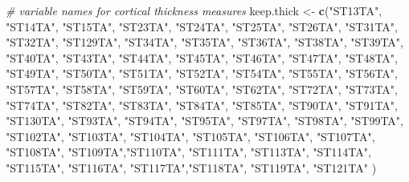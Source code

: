 \documentclass[
]{article}
\newenvironment{Shaded}{\begin{snugshade}}{\end{snugshade}}
\newcommand{\CommentTok}[1]{\textcolor[rgb]{0.56,0.35,0.01}{\textit{#1}}}
\newcommand{\KeywordTok}[1]{\textcolor[rgb]{0.13,0.29,0.53}{\textbf{#1}}}
\newcommand{\NormalTok}[1]{#1}
\newcommand{\StringTok}[1]{\textcolor[rgb]{0.31,0.60,0.02}{#1}}
\begin{document}
\begin{Shaded}
\begin{Highlighting}[]
\CommentTok{# variable names for cortical thickness measures}
\NormalTok{keep.thick <-}\StringTok{ }\KeywordTok{c}\NormalTok{(}\StringTok{"ST13TA"}\NormalTok{, }\StringTok{"ST14TA"}\NormalTok{, }\StringTok{"ST15TA"}\NormalTok{, }\StringTok{"ST23TA"}\NormalTok{, }\StringTok{"ST24TA"}\NormalTok{, }\StringTok{"ST25TA"}\NormalTok{,}
                \StringTok{"ST26TA"}\NormalTok{, }\StringTok{"ST31TA"}\NormalTok{, }\StringTok{"ST32TA"}\NormalTok{, }\StringTok{"ST129TA"}\NormalTok{, }\StringTok{"ST34TA"}\NormalTok{, }\StringTok{"ST35TA"}\NormalTok{,}
                \StringTok{"ST36TA"}\NormalTok{, }\StringTok{"ST38TA"}\NormalTok{, }\StringTok{"ST39TA"}\NormalTok{, }\StringTok{"ST40TA"}\NormalTok{, }\StringTok{"ST43TA"}\NormalTok{, }\StringTok{"ST44TA"}\NormalTok{,}
                \StringTok{"ST45TA"}\NormalTok{, }\StringTok{"ST46TA"}\NormalTok{, }\StringTok{"ST47TA"}\NormalTok{, }\StringTok{"ST48TA"}\NormalTok{, }\StringTok{"ST49TA"}\NormalTok{, }\StringTok{"ST50TA"}\NormalTok{,}
                \StringTok{"ST51TA"}\NormalTok{, }\StringTok{"ST52TA"}\NormalTok{, }\StringTok{"ST54TA"}\NormalTok{, }\StringTok{"ST55TA"}\NormalTok{, }\StringTok{"ST56TA"}\NormalTok{, }\StringTok{"ST57TA"}\NormalTok{,}
                \StringTok{"ST58TA"}\NormalTok{, }\StringTok{"ST59TA"}\NormalTok{, }\StringTok{"ST60TA"}\NormalTok{, }\StringTok{"ST62TA"}\NormalTok{, }\StringTok{"ST72TA"}\NormalTok{, }\StringTok{"ST73TA"}\NormalTok{,}
                \StringTok{"ST74TA"}\NormalTok{, }\StringTok{"ST82TA"}\NormalTok{, }\StringTok{"ST83TA"}\NormalTok{, }\StringTok{"ST84TA"}\NormalTok{, }\StringTok{"ST85TA"}\NormalTok{, }\StringTok{"ST90TA"}\NormalTok{,}
                \StringTok{"ST91TA"}\NormalTok{, }\StringTok{"ST130TA"}\NormalTok{, }\StringTok{"ST93TA"}\NormalTok{, }\StringTok{"ST94TA"}\NormalTok{, }\StringTok{"ST95TA"}\NormalTok{, }\StringTok{"ST97TA"}\NormalTok{,}
                \StringTok{"ST98TA"}\NormalTok{, }\StringTok{"ST99TA"}\NormalTok{, }\StringTok{"ST102TA"}\NormalTok{, }\StringTok{"ST103TA"}\NormalTok{, }\StringTok{"ST104TA"}\NormalTok{, }\StringTok{"ST105TA"}\NormalTok{,}
                \StringTok{"ST106TA"}\NormalTok{, }\StringTok{"ST107TA"}\NormalTok{, }\StringTok{"ST108TA"}\NormalTok{, }\StringTok{"ST109TA"}\NormalTok{,}\StringTok{"ST110TA"}\NormalTok{, }\StringTok{"ST111TA"}\NormalTok{,}
                \StringTok{"ST113TA"}\NormalTok{, }\StringTok{"ST114TA"}\NormalTok{, }\StringTok{"ST115TA"}\NormalTok{, }\StringTok{"ST116TA"}\NormalTok{, }\StringTok{"ST117TA"}\NormalTok{,}\StringTok{"ST118TA"}\NormalTok{,}
                \StringTok{"ST119TA"}\NormalTok{, }\StringTok{"ST121TA"}
\NormalTok{)}


\end{Highlighting}
\end{Shaded}
\end{document}

